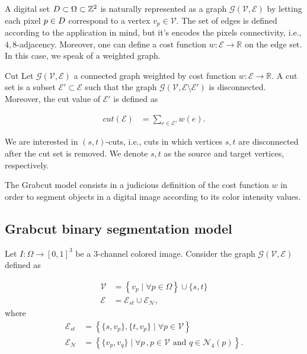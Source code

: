 A digital set $D \subset \Omega \subset \mathbb{Z}^2$ is naturally represented as a graph $\mathcal{G}(\mathcal{V},\mathcal{E})$ by letting each pixel $p \in D$ correspond to a vertex $v_p \in \mathcal{V}$. The set of edges is defined according to the application in mind, but it's encodes the pixels connectivity, i.e., $4,8$-adjacency.  Moreover, one can define a cost function $w:\mathcal{E}\rightarrow \mathbb{R}$ on the edge set. In this case, we speak of a weighted graph.

\begin{definition}{Cut}
Let $\mathcal{G}(\mathcal{V},\mathcal{E})$ a connected graph weighted  by cost function $w:\mathcal{E}\rightarrow \mathbb{R}$. A cut set is a subset $\mathcal{E}' \subset \mathcal{E}$ such that the graph $\mathcal{G}(\mathcal{V},\mathcal{E} \setminus \mathcal{E}')$ is disconnected. Moreover, the cut value of $\mathcal{E}'$ is defined as

\begin{align*}
	cut(\mathcal{E}) &= \sum_{e \in \mathcal{E}'}{w(e)}.
\end{align*}
\end{definition}

We are interested in $(s,t)$-cuts, i.e., cuts in which vertices $s,t$ are disconnected after the cut set is removed. We denote $s,t$ as the source and target vertices, respectively. 


The Grabcut model consists in a judicious definition of the cost function $w$ in order to segment objects in a digital image according to its color intensity values.

\subsection{Grabcut binary segmentation model}
Let $I:\Omega\rightarrow [0,1]^3$ be a $3$-channel colored image. Consider the graph $\mathcal{G}(\mathcal{V},\mathcal{E})$ defined as

\begin{align*}
	\mathcal{V} &= \left\{ v_p \; | \; \forall p \in \Omega \right\} \cup \{s,t\}\\
	\mathcal{E} &= \mathcal{E}_{st} \cup \mathcal{E}_{\mathcal{N}},
\end{align*}
where 
\begin{align*}
\mathcal{E}_{st} &= \left\{ \{s,v_p\}, \{t,v_p\} \; | \; \forall p \in \mathcal{V}  \right\} \\
\mathcal{E}_{\mathcal{N}} &= \left\{ \{v_p,v_q\} \; | \; \forall p\,, p \in \mathcal{V} \text{ and } q\in \mathcal{N}_4(p)  \right\}.
\end{align*}

